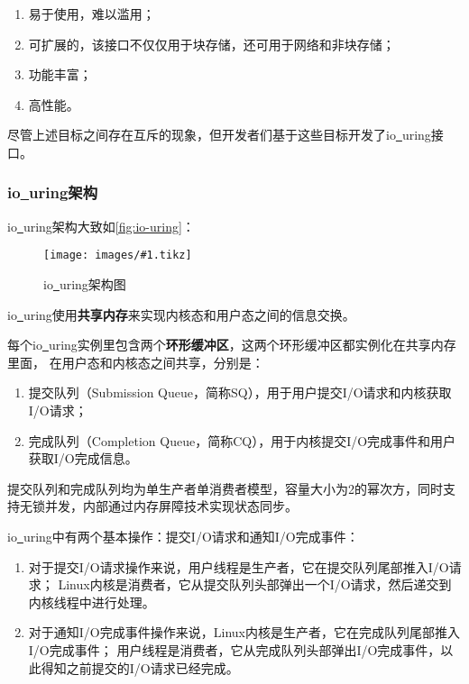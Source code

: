 \documentclass[supercite]{HustGraduPaper}
\newcommand{\cfig}[3]{
  \begin{figure}[htb]
    \centering
    \texttt{[image: images/\#1.tikz]}
    \caption{#3}
    \label{fig:#1}
  \end{figure}
}
\newcommand{\rfig}[1]{\autoref{fig:#1}}
\theoremstyle{definition}
\begin{document}
\begin{enumerate}[label={(\arabic*)}]
  \item 易于使用，难以滥用；
  \item 可扩展的，该接口不仅仅用于块存储，还可用于网络和非块存储；
  \item 功能丰富；
  \item 高性能。
\end{enumerate}

尽管上述目标之间存在互斥的现象，但开发者们基于这些目标开发了io\underline{~}uring接口。\par

\subsubsection{io\underline{~}uring架构}
io\underline{~}uring架构大致如\rfig{io-uring}：\par

\cfig{io-uring}{0.8}{io\underline{~}uring架构图}

io\underline{~}uring使用\textbf{共享内存}\cite{adve1996shared}来实现内核态和用户态之间的信息交换。\par

每个io\underline{~}uring实例里包含两个\textbf{环形缓冲区}，这两个环形缓冲区都实例化在共享内存里面，
在用户态和内核态之间共享，分别是：

\begin{enumerate}[label={(\arabic*)}]
  \item 提交队列（Submission Queue，简称SQ），用于用户提交I/O请求和内核获取I/O请求；
  \item 完成队列（Completion Queue，简称CQ），用于内核提交I/O完成事件和用户获取I/O完成信息。
\end{enumerate}

提交队列和完成队列均为单生产者单消费者模型，容量大小为2的幂次方，同时支持无锁并发，内部通过内存屏障\cite{mosberger1993memory}技术实现状态同步。\par

io\underline{~}uring中有两个基本操作：提交I/O请求和通知I/O完成事件：
\begin{enumerate}[label={(\arabic*)}]
  \item 对于提交I/O请求操作来说，用户线程是生产者，它在提交队列尾部推入I/O请求；
    Linux内核是消费者，它从提交队列头部弹出一个I/O请求，然后递交到内核线程中进行处理。
  \item 对于通知I/O完成事件操作来说，Linux内核是生产者，它在完成队列尾部推入I/O完成事件；
    用户线程是消费者，它从完成队列头部弹出I/O完成事件，以此得知之前提交的I/O请求已经完成。
\end{enumerate}
\end{document}

